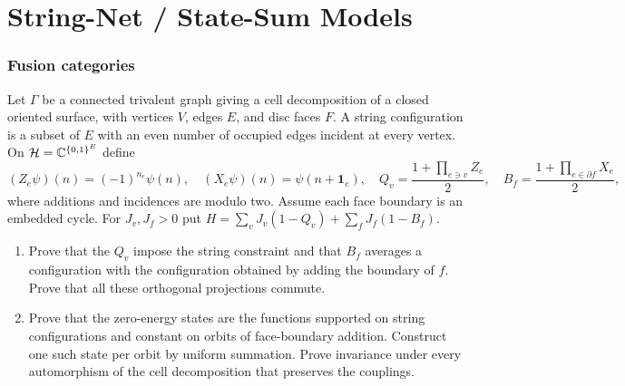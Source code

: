 \part{String-Net / State-Sum Models}

\section{Fusion categories}

\begin{exercise}
Let $\Gamma$ be a connected trivalent graph giving a cell decomposition
of a closed oriented surface, with vertices $V$, edges $E$, and disc
faces $F$. A string configuration is a subset of $E$ with an even
number of occupied edges incident at every vertex. On
$\mathcal H=\mathbb C^{\{0,1\}^E}$ define
\[
 (Z_e\psi)(n)=(-1)^{n_e}\psi(n),\quad
 (X_e\psi)(n)=\psi(n+\mathbf1_e),\quad
 Q_v=\frac{1+\prod_{e\ni v}Z_e}{2},\quad
 B_f=\frac{1+\prod_{e\in\partial f}X_e}{2},
\]
where additions and incidences are modulo two. Assume each face
boundary is an embedded cycle. For $J_v,J_f>0$ put
$H=\sum_vJ_v(1-Q_v)+\sum_fJ_f(1-B_f)$.
\begin{enumerate}[label=(\alph*)]
\item Prove that the $Q_v$ impose the string constraint and that
$B_f$ averages a configuration with the configuration obtained by
adding the boundary of $f$. Prove that all these orthogonal
projections commute.
\item Prove that the zero-energy states are the functions supported
on string configurations and constant on orbits of face-boundary
addition. Construct one such state per orbit by uniform summation.
Prove invariance under every automorphism of the cell decomposition
that preserves the couplings.
\end{enumerate}
\end{exercise}

